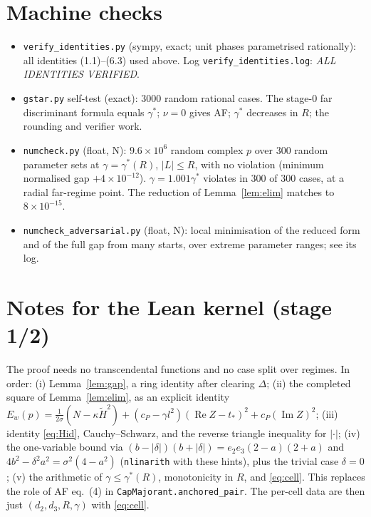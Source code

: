\documentclass[11pt]{article}
\theoremstyle{remark}
\renewcommand{\Re}{\operatorname{Re}}
\renewcommand{\Im}{\operatorname{Im}}
\begin{document}
\section{Machine checks}
\begin{itemize}
\item \texttt{verify\_identities.py} (sympy, exact; unit phases parametrised rationally): all identities (1.1)--(6.3) used
above. Log \texttt{verify\_identities.log}: \emph{ALL IDENTITIES VERIFIED}.
\item \texttt{gstar.py} self-test (exact): 3000 random rational cases. The stage-0 far discriminant formula equals $\gamma^*$;
$\nu=0$ gives AF; $\gamma^*$ decreases in $R$; the rounding and verifier work.
\item \texttt{numcheck.py} (float, N): $9.6\times10^6$ random complex $p$ over 300 random parameter sets at
$\gamma=\gamma^*(R)$, $|L|\le R$, with no violation (minimum normalised gap $+4\times10^{-12}$). $\gamma=1.001\gamma^*$ violates
in 300 of 300 cases, at a radial far-regime point. The reduction of Lemma~\ref{lem:elim} matches to $8\times10^{-15}$.
\item \texttt{numcheck\_adversarial.py} (float, N): local minimisation of the reduced form and of the full gap from many starts,
over extreme parameter ranges; see its log.
\end{itemize}

\section{Notes for the Lean kernel (stage 1/2)}
The proof needs no transcendental functions and no case split over regimes. In order:
(i) Lemma~\ref{lem:gap}, a ring identity after clearing $\Delta$;
(ii) the completed square of Lemma~\ref{lem:elim}, as an explicit identity
$E_w(p)=\frac1{2\sigma}(N-\kappa\widetilde H^2)+(c_P-\gamma l^2)(\Re Z-t_*)^2+c_P(\Im Z)^2$;
(iii) identity \eqref{eq:Hid}, Cauchy--Schwarz, and the reverse triangle inequality for $|\cdot|$;
(iv) the one-variable bound via $(b-|\delta|)(b+|\delta|)=e_2e_3(2-a)(2+a)$ and $4b^2-\delta^2a^2=\sigma^2(4-a^2)$ (\texttt{nlinarith}
with these hints), plus the trivial case $\delta=0$;
(v) the arithmetic of $\gamma\le\gamma^*(R)$, monotonicity in $R$, and \eqref{eq:cell}.
This replaces the role of AF eq.~(4) in \texttt{CapMajorant.anchored\_pair}. The per-cell data are then just $(d_2,d_3,R,\gamma)$
with \eqref{eq:cell}.
\end{document}
